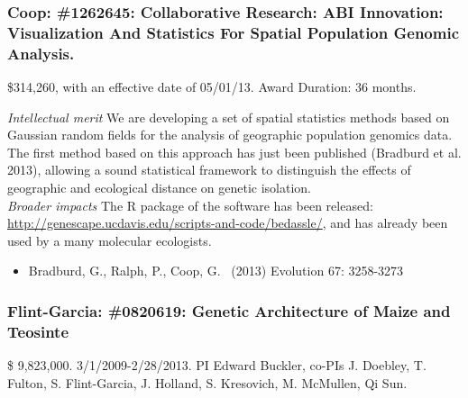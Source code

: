 \subsubsection*{Coop: \#1262645: Collaborative Research: ABI Innovation: Visualization And Statistics For Spatial Population Genomic Analysis. }
\$314,260, with an effective date of 05/01/13. Award Duration: 36 months.

\emph{Intellectual merit} We are developing a set of spatial statistics methods based on Gaussian random fields for the analysis of geographic population genomics data. The first method based on this approach has just been published (Bradburd et al. 2013), allowing a sound statistical framework to distinguish the effects of geographic and ecological distance on genetic isolation. \\
\emph{Broader impacts} The R package of the software has been released: \url{http://genescape.ucdavis.edu/scripts-and-code/bedassle/}, and has already been used by a many molecular ecologists. 

\begin{itemize} 
\item Bradburd, G., Ralph, P., Coop, G.  (2013) Evolution 67: 3258-3273
\end{itemize}

\subsubsection*{Flint-Garcia: \#0820619: Genetic Architecture of Maize and Teosinte}
\$ 9,823,000. 3/1/2009-2/28/2013. PI Edward Buckler, co-PIs J. Doebley, T. Fulton, S. Flint-Garcia, J. Holland, S. Kresovich, M. McMullen, Qi Sun. 

